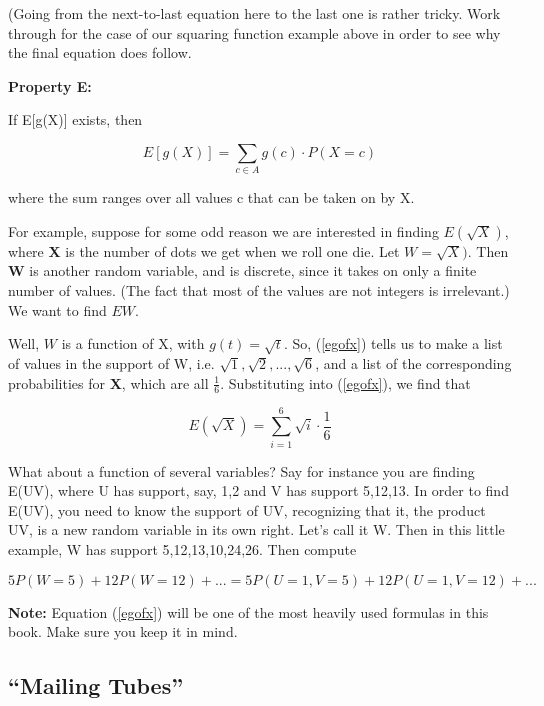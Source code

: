 (Going from the next-to-last equation here to the last one is rather
tricky.  Work through for the case of our squaring function example
above in order to see why the final equation does follow.

{\bf Property E:}

If E[g(X)] exists, then

\begin{equation}
\label{egofx}
E[g(X)] = \sum_{c \in A} g(c) \cdot P(X = c)
\end{equation}

where the sum ranges over all values c that can be taken on by X.

For example, suppose for some odd reason we are interested in finding
$E(\sqrt{X})$, where {\bf X} is the number of dots we get when we roll
one die.  Let $W = \sqrt{X})$.  Then {\bf W} is another random variable,
and is discrete, since it takes on only a finite number of values.  (The
fact that most of the values are not integers is irrelevant.)  We want
to find $EW$.

Well, $W$ is a function of X, with $g(t) = \sqrt{t}$.  So,
(\ref{egofx}) tells us to make a list of values in the support
of W, i.e.  $\sqrt{1}, \sqrt{2}, ..., \sqrt{6}$, and a list of the
corresponding probabilities for {\bf X}, which are all $\frac{1}{6}$.
Substituting into (\ref{egofx}), we find that

\begin{equation}
E(\sqrt{X}) = 
\sum_{i=1}^6 \sqrt{i} \cdot
\frac{1}{6} 
\end{equation}

What about a function of several variables?  Say for instance 
you are finding E(UV), where U has support, say, 1,2 and V has
support 5,12,13.  In order to find E(UV), you need to know the support
of UV, recognizing that it, the product UV, is a new random variable in
its own right.  Let's call it W.  Then in this little example, W has
support 5,12,13,10,24,26.  Then compute

$$
5 P(W = 5) + 12 P(W = 12) + ...
= 5 P(U = 1, V = 5) + 12 P(U = 1, V = 12) + ...
$$

{\bf Note:}  Equation (\ref{egofx}) will be one of the most heavily used
formulas in this book.  Make sure you keep it in mind.

\subsection{``Mailing Tubes''}
\label{mailingtubes2}

